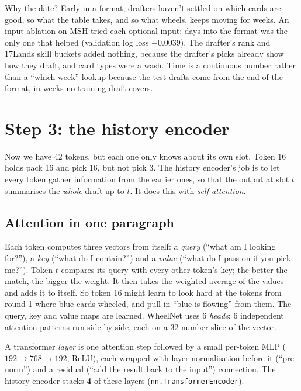 \documentclass[11pt,letterpaper]{article}
\newcommand{\code}[1]{\texttt{\small #1}}
\begin{document}
Why the date? Early in a format, drafters haven't settled on which cards are good, so what the table takes,
and so what wheels, keeps moving for weeks. An input ablation on MSH tried each optional input: days into the
format was the only one that helped (validation log loss $-$0.0039). The drafter's rank and 17Lands skill
buckets added nothing, because the drafter's picks already show how they draft, and card types were a
wash. Time is a continuous number rather than a ``which week'' lookup because the test drafts come from the
end of the format, in weeks no training draft covers.

\section{Step 3: the history encoder}\label{sec:causal}

Now we have 42 tokens, but each one only knows about its own slot. Token 16 holds pack 16 and pick 16, but
not pick 3. The history encoder's job is to let every token gather information from the earlier ones, so
that the output at slot $t$ summarises the \emph{whole} draft up to $t$. It does this with
\emph{self-attention}.

\subsection{Attention in one paragraph}

Each token computes three vectors from itself: a \emph{query} (``what am I looking for?''), a \emph{key}
(``what do I contain?'') and a \emph{value} (``what do I pass on if you pick me?''). Token $t$ compares its
query with every other token's key; the better the match, the bigger the weight. It then takes the
weighted average of the values and adds it to itself. So token 16 might learn to look hard at the tokens
from round 1 where blue cards wheeled, and pull in ``blue is flowing'' from them. The query, key and value maps are
learned. WheelNet uses 6 \emph{heads}: 6 independent attention patterns run side by side, each on a 32-number
slice of the vector.

A transformer \emph{layer} is one attention step followed by a small per-token MLP ($192\to768\to192$, ReLU),
each wrapped with layer normalisation before it (``pre-norm'') and a residual (``add the result back to the
input'') connection. The history encoder stacks \textbf{4} of these layers (\code{nn.TransformerEncoder}).
\end{document}
